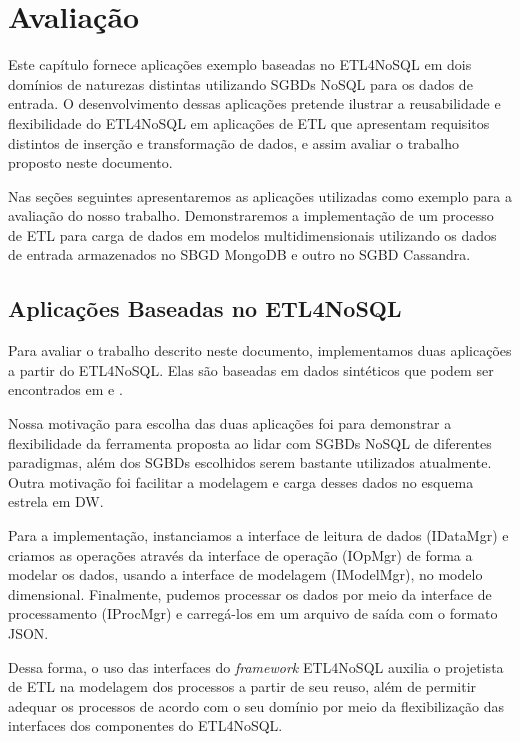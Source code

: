\chapter{Avaliação}

Este capítulo fornece aplicações exemplo baseadas no ETL4NoSQL em dois domínios de naturezas distintas utilizando SGBDs NoSQL para os dados de entrada. O desenvolvimento dessas aplicações pretende ilustrar a reusabilidade e flexibilidade do ETL4NoSQL em aplicações de ETL que apresentam requisitos distintos de inserção e transformação de dados, e assim avaliar o trabalho proposto neste documento.

Nas seções seguintes apresentaremos as aplicações utilizadas como exemplo para a avaliação do nosso trabalho. Demonstraremos a implementação de um processo de ETL para carga de dados em modelos multidimensionais utilizando os dados de entrada armazenados no SBGD MongoDB e outro no SGBD Cassandra.

\clearpage	

\section{Aplicações Baseadas no ETL4NoSQL}

Para avaliar o trabalho descrito neste documento, implementamos duas aplicações a partir do ETL4NoSQL. Elas são baseadas em dados sintéticos que podem ser encontrados em \cite{dataMongo} e \cite{dataCassandra}. 

Nossa motivação para escolha das duas aplicações foi para demonstrar a flexibilidade da ferramenta proposta ao lidar com SGBDs NoSQL de diferentes paradigmas, além dos SGBDs escolhidos serem bastante utilizados atualmente. Outra motivação foi facilitar a modelagem e carga desses dados no esquema estrela em DW.

Para a implementação, instanciamos a interface de leitura de dados (IDataMgr) e criamos as operações através da interface de operação (IOpMgr) de forma a modelar os dados, usando a interface de modelagem (IModelMgr), no modelo dimensional. Finalmente, pudemos processar os dados por meio da interface de processamento (IProcMgr) e carregá-los em um arquivo de saída com o formato JSON.

Dessa forma, o uso das interfaces do \textit{framework} ETL4NoSQL auxilia o projetista de ETL na modelagem dos processos a partir de seu reuso, além de permitir adequar os processos de acordo com o seu domínio por meio da flexibilização das interfaces dos componentes do ETL4NoSQL.

